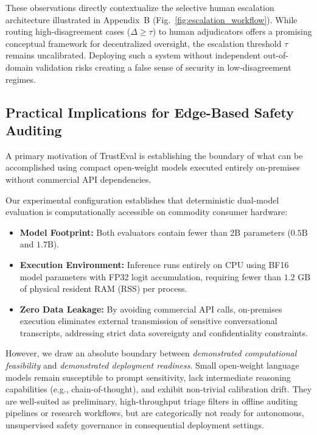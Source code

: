 These observations directly contextualize the selective human escalation architecture illustrated in Appendix~B (Fig.~\ref{fig:escalation_workflow}). While routing high-disagreement cases ($\Delta \ge \tau$) to human adjudicators offers a promising conceptual framework for decentralized oversight, the escalation threshold $\tau$ remains uncalibrated. Deploying such a system without independent out-of-domain validation risks creating a false sense of security in low-disagreement regimes.

\subsection{Practical Implications for Edge-Based Safety Auditing}
\label{subsec:disc_practical_implications}

A primary motivation of TrustEval is establishing the boundary of what can be accomplished using compact open-weight models executed entirely on-premises without commercial API dependencies.

Our experimental configuration establishes that deterministic dual-model evaluation is computationally accessible on commodity consumer hardware:
\begin{itemize}
    \item \textbf{Model Footprint:} Both evaluators contain fewer than 2B parameters ($0.5\text{B}$ and $1.7\text{B}$).
    \item \textbf{Execution Environment:} Inference runs entirely on CPU using BF16 model parameters with FP32 logit accumulation, requiring fewer than $1.2\text{ GB}$ of physical resident RAM (RSS) per process.
    \item \textbf{Zero Data Leakage:} By avoiding commercial API calls, on-premises execution eliminates external transmission of sensitive conversational transcripts, addressing strict data sovereignty and confidentiality constraints.
\end{itemize}

However, we draw an absolute boundary between \textit{demonstrated computational feasibility} and \textit{demonstrated deployment readiness}. Small open-weight language models remain susceptible to prompt sensitivity, lack intermediate reasoning capabilities (e.g., chain-of-thought), and exhibit non-trivial calibration drift. They are well-suited as preliminary, high-throughput triage filters in offline auditing pipelines or research workflows, but are categorically not ready for autonomous, unsupervised safety governance in consequential deployment settings.

